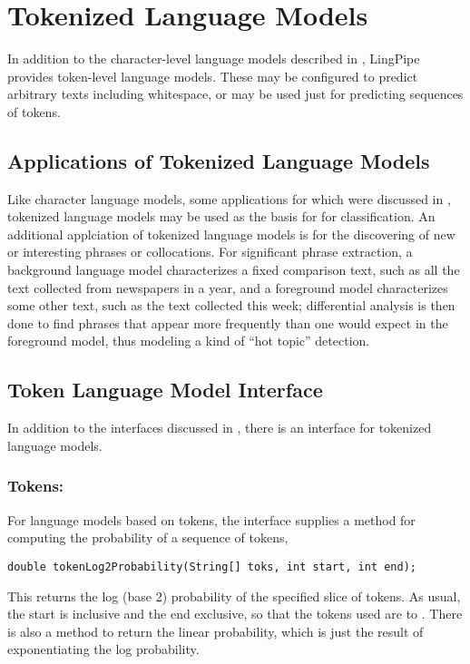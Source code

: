 \chapter{Tokenized Language Models}\label{chap:tok-lm}

In addition to the character-level language models described
in , LingPipe provides token-level language
models.  These may be configured to predict arbitrary texts
including whitespace, or may be used just for predicting sequences
of tokens.  

\section{Applications of Tokenized Language Models}

Like character language models, some applications for which were
discussed in , tokenized language models may be
used as the basis for for classification.  An additional applciation
of tokenized language models is for the discovering of new or
interesting phrases or collocations.  For significant phrase
extraction, a background language model characterizes a fixed
comparison text, such as all the text collected from newspapers in a
year, and a foreground model characterizes some other text, such as
the text collected this week; differential analysis is then done to
find phrases that appear more frequently than one would expect in the
foreground model, thus modeling a kind of ``hot topic'' detection.


\section{Token Language Model Interface}

In addition to the interfaces discussed in ,
there is an interface for tokenized language models.

\subsection{Tokens: }

For language models based on tokens, the interface
 supplies a method for
computing the probability of a sequence of tokens,
%
\begin{verbatim}
double tokenLog2Probability(String[] toks, int start, int end);
\end{verbatim}
%
This returns the log (base 2) probability of the specified slice of
tokens.  As usual, the start is inclusive and the end exclusive, so
that the tokens used are  to .
There is also a method to return the linear probability, which is just
the result of exponentiating the log probability.  

